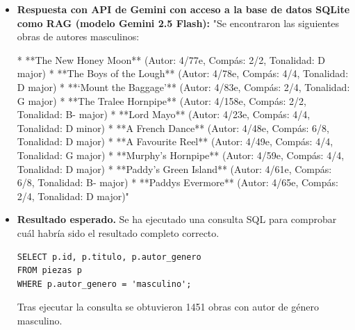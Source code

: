 \begin{itemize}
Es importante destacar que no hay información en absoluto sobre los autores de las otras piezas. En algunos casos, la música puede ser anónima o tener múltiples contribuidores."
\item \textbf{Respuesta con API de Gemini con acceso a la base de datos SQLite como RAG (modelo Gemini 2.5 Flash):} "Se encontraron las siguientes obras de autores masculinos:

*   **The New Honey Moon** (Autor: 4/77e, Compás: 2/2, Tonalidad: D major)
*   **The Boys of the Lough** (Autor: 4/78e, Compás: 4/4, Tonalidad: D major)
*   **‘Mount the Baggage’** (Autor: 4/83e, Compás: 2/4, Tonalidad: G major)
*   **The Tralee Hornpipe** (Autor: 4/158e, Compás: 2/2, Tonalidad: B- major)
*   **Lord Mayo** (Autor: 4/23e, Compás: 4/4, Tonalidad: D minor)
*   **A French Dance** (Autor: 4/48e, Compás: 6/8, Tonalidad: D major)
*   **A Favourite Reel** (Autor: 4/49e, Compás: 4/4, Tonalidad: G major)
*   **Murphy’s Hornpipe** (Autor: 4/59e, Compás: 4/4, Tonalidad: D major)
*   **Paddy’s Green Island** (Autor: 4/61e, Compás: 6/8, Tonalidad: B- major)
*   **Paddys Evermore** (Autor: 4/65e, Compás: 2/4, Tonalidad: D major)"  
\item \textbf{Resultado esperado.} Se ha ejecutado una consulta SQL para comprobar cuál habría sido el resultado completo correcto.
    \begin{verbatim}
SELECT p.id, p.titulo, p.autor_genero
FROM piezas p
WHERE p.autor_genero = 'masculino';
    \end{verbatim}    
    Tras ejecutar la consulta se obtuvieron 1451 obras con autor de género masculino.
    
\end{itemize}


